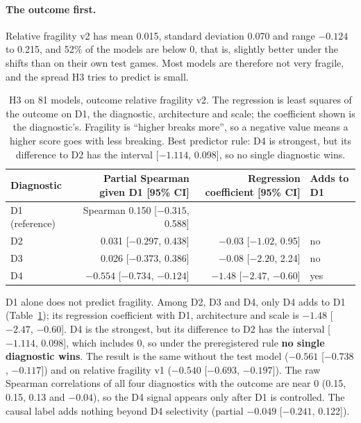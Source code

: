 \documentclass[11pt]{scrartcl}
\begin{document}
\paragraph{The outcome first.} Relative fragility v2 has mean 0.015, standard deviation 0.070 and range
$-0.124$ to 0.215, and 52\% of the models are below 0, that is, slightly better under the shifts than on their
own test games. Most models are therefore not very fragile, and the spread H3 tries to predict is small.

\begin{table}[H]
    \centering
    \small
    \begin{tabular}{lrrl}
    \toprule
    Diagnostic & Partial Spearman given D1 [95\% CI] & Regression coefficient [95\% CI] & Adds to D1 \\
    \midrule
    D1 (reference) & Spearman 0.150 [$-0.315$, 0.588] & & \\
    D2 & 0.031 [$-0.297$, 0.438] & $-0.03$ [$-1.02$, 0.95] & no \\
    D3 & 0.026 [$-0.373$, 0.386] & $-0.08$ [$-2.20$, 2.24] & no \\
    D4 & $-0.554$ [$-0.734$, $-0.124$] & $-1.48$ [$-2.47$, $-0.60$] & yes \\
    \bottomrule
    \end{tabular}
    \caption{H3 on 81 models, outcome relative fragility v2. The regression is least squares of the outcome on
    D1, the diagnostic, architecture and scale; the coefficient shown is the diagnostic's. Fragility is
    ``higher breaks more'', so a negative value means a higher score goes with less breaking. Best predictor
    rule: D4 is strongest, but its difference to D2 has the interval [$-1.114$, 0.098], so no single diagnostic
    wins.}
    \label{tab:h3}
\end{table}

D1 alone does not predict fragility. Among D2, D3 and D4, only D4 adds to D1 (Table~\ref{tab:h3}); its
regression coefficient with D1, architecture and scale is $-1.48$ [$-2.47$, $-0.60$]. D4 is the strongest, but
its difference to D2 has the interval [$-1.114$, 0.098], which includes 0, so under the preregistered rule
\textbf{no single diagnostic wins}. The result is the same without the test model ($-0.561$ [$-0.738$, $-0.117$])
and on relative fragility v1 ($-0.540$ [$-0.693$, $-0.197$]). The raw Spearman correlations of all four
diagnostics with the outcome are near 0 (0.15, 0.15, 0.13 and $-0.04$), so the D4 signal appears only after D1
is controlled. The causal label adds nothing beyond D4 selectivity (partial $-0.049$ [$-0.241$, 0.122]).
\end{document}
